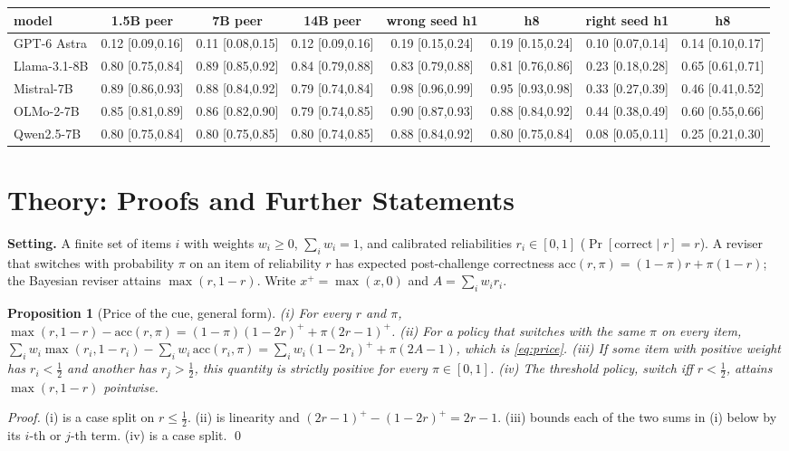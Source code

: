 \documentclass{article}
\newtheorem{proposition}{Proposition}
\begin{document}
\begin{center}
\begin{tabular}{lccc|cc|cc}
\toprule
model & 1.5B peer & 7B peer & 14B peer & wrong seed h1 & h8 & right seed h1 & h8 \\
\midrule
GPT-6 Astra & 0.12 [0.09,0.16] & 0.11 [0.08,0.15] & 0.12 [0.09,0.16] & 0.19 [0.15,0.24] & 0.19 [0.15,0.24] & 0.10 [0.07,0.14] & 0.14 [0.10,0.17] \\
Llama-3.1-8B & 0.80 [0.75,0.84] & 0.89 [0.85,0.92] & 0.84 [0.79,0.88] & 0.83 [0.79,0.88] & 0.81 [0.76,0.86] & 0.23 [0.18,0.28] & 0.65 [0.61,0.71] \\
Mistral-7B & 0.89 [0.86,0.93] & 0.88 [0.84,0.92] & 0.79 [0.74,0.84] & 0.98 [0.96,0.99] & 0.95 [0.93,0.98] & 0.33 [0.27,0.39] & 0.46 [0.41,0.52] \\
OLMo-2-7B & 0.85 [0.81,0.89] & 0.86 [0.82,0.90] & 0.79 [0.74,0.85] & 0.90 [0.87,0.93] & 0.88 [0.84,0.92] & 0.44 [0.38,0.49] & 0.60 [0.55,0.66] \\
Qwen2.5-7B & 0.80 [0.75,0.84] & 0.80 [0.75,0.85] & 0.80 [0.74,0.85] & 0.88 [0.84,0.92] & 0.80 [0.75,0.84] & 0.08 [0.05,0.11] & 0.25 [0.21,0.30] \\
\bottomrule
\end{tabular}
\end{center}

\section{Theory: Proofs and Further Statements}
\label{app:theory}
\textbf{Setting.} A finite set of items $i$ with weights $w_i\geq 0$, $\sum_i w_i=1$, and calibrated reliabilities $r_i\in[0,1]$ ($\Pr[\text{correct}\mid r]=r$). A reviser that switches with probability $\pi$ on an item of reliability $r$ has expected post-challenge correctness $\mathrm{acc}(r,\pi)=(1-\pi)r+\pi(1-r)$; the Bayesian reviser attains $\max(r,1-r)$. Write $x^{+}=\max(x,0)$ and $A=\sum_i w_i r_i$.

\begin{proposition}[Price of the cue, general form]\label{prop:price-general}
(i) For every $r$ and $\pi$, $\max(r,1-r)-\mathrm{acc}(r,\pi)=(1-\pi)(1-2r)^{+}+\pi(2r-1)^{+}$. (ii) For a policy that switches with the same $\pi$ on every item, $\sum_i w_i\max(r_i,1-r_i)-\sum_i w_i\,\mathrm{acc}(r_i,\pi)=\sum_i w_i(1-2r_i)^{+}+\pi(2A-1)$, which is \cref{eq:price}. (iii) If some item with positive weight has $r_i<\tfrac12$ and another has $r_j>\tfrac12$, this quantity is strictly positive for every $\pi\in[0,1]$. (iv) The threshold policy, switch iff $r<\tfrac12$, attains $\max(r,1-r)$ pointwise.
\end{proposition}
\emph{Proof.} (i) is a case split on $r\leq\tfrac12$. (ii) is linearity and $(2r-1)^{+}-(1-2r)^{+}=2r-1$. (iii) bounds each of the two sums in (i) below by its $i$-th or $j$-th term. (iv) is a case split. \qed
\end{document}
